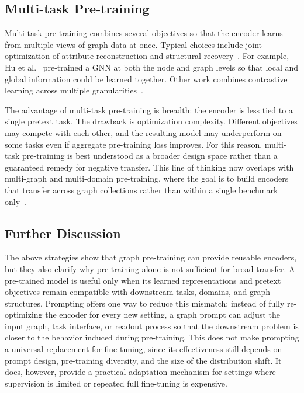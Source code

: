 \subsection{Multi-task Pre-training}\label{subsec:multi_pre}
Multi-task pre-training combines several objectives so that the encoder learns from multiple views of graph data at once. Typical choices include joint optimization of attribute reconstruction and structural recovery~\cite{hu2020strategies, hu2020gptgnn, zhang2020graphbert, fang2022geometryenhanced}. For example, Hu et al.~\cite{hu2020strategies} pre-trained a GNN at both the node and graph levels so that local and global information could be learned together. Other work combines contrastive learning across multiple granularities~\cite{jiang2021contrastive, xu2021infogcl}.

The advantage of multi-task pre-training is breadth: the encoder is less tied to a single pretext task. The drawback is optimization complexity. Different objectives may compete with each other, and the resulting model may underperform on some tasks even if aggregate pre-training loss improves. For this reason, multi-task pre-training is best understood as a broader design space rather than a guaranteed remedy for negative transfer. This line of thinking now overlaps with multi-graph and multi-domain pre-training, where the goal is to build encoders that transfer across graph collections rather than within a single benchmark only~\cite{lachi2024graphfm, yu2025samgpt}.


\subsection{Further Discussion} \label{subsec:pre-train-dis}
The above strategies show that graph pre-training can provide reusable encoders, but they also clarify why pre-training alone is not sufficient for broad transfer. A pre-trained model is useful only when its learned representations and pretext objectives remain compatible with downstream tasks, domains, and graph structures. Prompting offers one way to reduce this mismatch: instead of fully re-optimizing the encoder for every new setting, a graph prompt can adjust the input graph, task interface, or readout process so that the downstream problem is closer to the behavior induced during pre-training. This does not make prompting a universal replacement for fine-tuning, since its effectiveness still depends on prompt design, pre-training diversity, and the size of the distribution shift. It does, however, provide a practical adaptation mechanism for settings where supervision is limited or repeated full fine-tuning is expensive.
